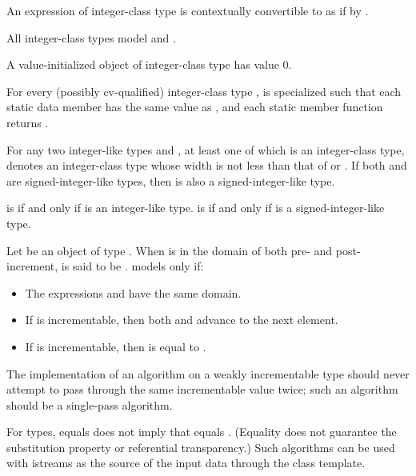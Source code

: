 \pnum
An expression  of integer-class type  is
contextually convertible to 
as if by .

\pnum
All integer-class types model
 and
.

\pnum
A value-initialized object of integer-class type has value 0.

\pnum
For every (possibly cv-qualified) integer-class type ,
 is specialized such that
each static data member 
has the same value as , and
each static member function 
returns .

\pnum
For any two integer-like types  and ,
at least one of which is an integer-class type,
 denotes an integer-class type
whose width is not less than that of  or .
If both  and  are signed-integer-like types,
then  is also a signed-integer-like type.

\pnum
{} is 
if and only if  is an integer-like type.
 is 
if and only if  is a signed-integer-like type.

\pnum
Let  be an object of type . When  is in the domain of
both pre- and post-increment,  is said to be .
 models  only if:
\begin{itemize}
\item The expressions  and  have the same domain.
\item If  is incrementable, then both 
  and  advance  to the next element.
\item If  is incrementable, then
   is equal to
  .
\end{itemize}

\pnum
\recommended
The implementation of an algorithm on a weakly incrementable type
should never attempt to pass through the same incrementable value twice;
such an algorithm should be a single-pass algorithm.
\begin{note}
For  types,  equals  does not imply that 
equals . (Equality does not guarantee the substitution property or referential
transparency.)
Such algorithms
can be used with istreams as the source of the input data through the  class
template.
\end{note}

